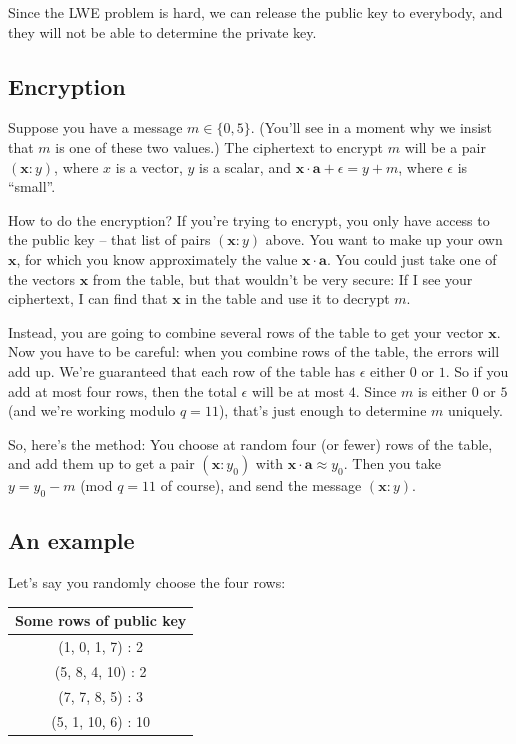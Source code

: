Since the LWE problem is hard, we can release the public key to
everybody, and they will not be able to determine the private key.

\subsection{Encryption}\label{how-to-encrypt-mu}

Suppose you have a message $m \in \{ 0,5 \}$. (You'll see
in a moment why we insist that $m$ is one of these two values.) The
ciphertext to encrypt $m$ will be a pair
$( \mathbf{x}:y )$, where $x$ is a vector, $y$ is a
scalar, and $\mathbf{x} \cdot \mathbf{a} + \epsilon = y + m$, where
$\epsilon$ is ``small''.

How to do the encryption? If you're trying to encrypt, you only have
access to the public key -- that list of pairs
$( \mathbf{x}:y )$ above. You want to make up your own
$\mathbf{x}$, for which you know approximately the value
$\mathbf{x} \cdot \mathbf{a}$. You could just take one of the vectors
$\mathbf{x}$ from the table, but that wouldn't be very secure: If I
see your ciphertext, I can find that $\mathbf{x}$ in the table and use
it to decrypt $m$.

Instead, you are going to combine several rows of the table to get your
vector $\mathbf{x}$. Now you have to be careful: when you combine rows
of the table, the errors will add up. We're guaranteed that each row of
the table has $\epsilon$ either $0$ or $1$. So if you add at most
four rows, then the total $\epsilon$ will be at most $4$. Since
$m$ is either $0$ or $5$ (and we're working modulo $q = 11$),
that's just enough to determine $m$ uniquely.

So, here's the method: You choose at random four (or fewer) rows of the
table, and add them up to get a pair $( \mathbf{x}:y_{0} )$
with $\mathbf{x} \cdot \mathbf{a} \approx y_{0}$. Then you take
$y = y_{0} - m$ (mod $q = 11$ of course), and send the message
$( \mathbf{x}:y )$.

\subsection{An example}\label{an-example}

Let's say you randomly choose the four rows:

\begin{center}
\begin{tabular}{|c|}
\hline
Some rows of public key \\
\hline
\hline
(1, 0, 1, 7) : 2 \\
\hline
(5, 8, 4, 10) : 2 \\
\hline
(7, 7, 8, 5) : 3 \\
\hline
(5, 1, 10, 6) : 10 \\
\hline
\end{tabular}
\end{center}


